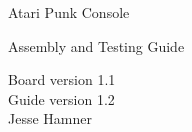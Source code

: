 \documentclass[12pt]{article}
\newcommand{\+}{\item}		%
\newcommand{\revision}{1.1}
\newif\ifkey
\begin{document}
\thispagestyle{empty}
\begin{center}
\begin{Huge}
Atari Punk Console\\
\end{Huge}
\bigskip
\begin{Large}
\ifkey
Assembly, Testing, and Designer's Guide\\
\else
Assembly and Testing Guide\\
\fi

\end{Large}
\bigskip
Board version \revision\\
Guide version 1.2\\
Jesse Hamner\\
\vspace{0.2in}


\end{center}

\tableofcontents

\vfill 
\end{document}
